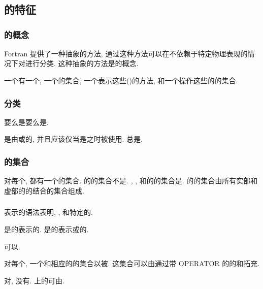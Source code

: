 \chapter{\Type{}}

\section{\Type{}的特征}

\subsection{\Type{}的概念}

Fortran 提供了一种抽象的方法, 通过这种方法可以在不依赖于特定物理表现的情况下对\Data{}进行分类. 这种抽象的方法是\Type{}的概念.

一个\Type{}有一个\Name{}, 一个\Valid{}\Value{}的集合, 一个表示这些\Value{}(\Constant{})的方法, 和一个操作这些\Value{}的\Operation{}的集合.

\subsection{\Type{}分类}

\Type{}要么是\IntrinsicType{}要么是\DerivedType{}.

\DerivedType{}是由\DerivedType{}\Definition{}或\Intrinsic{}\Module{}\Define{}的, 并且应该仅当是\Accessible{}之时被使用. \IntrinsicType{}总是\Accessible{}.

\subsection{\Value{}的集合}

对每个\Type{}, 都有一个\Valid{}\Value{}的集合. \LogicalType{}的\Valid{}\Value{}的集合不是\ProcessorDependent{}. \IntegerType{}, \CharacterType{}, 和\RealType{}的\Valid{}\Value{}的集合是\ProcessorDependent{}. \ComplexType{}的\Valid{}\Value{}的集合由所有实部和虚部的\Value{}的结合的集合组成.

\subsection{\Constant{}}

表示\Value{}的语法表明\Type{}, \TypeParameter{}, 和特定的\Value{}.

是\Constant{}\Expression{}的\StructureConstructor{}表示\DerivedType{}的\Scalar{}\Constant{}\Value{}. 是\Constant{}\Expression{}的\ArrayConstructor{}表示\IntrinsicType{}或\DerivedType{}的\Constant{}\Array{}\Value{}.

\Constant{}\Value{}可以\Named{}.

对每个\IntrinsicType{}, 一个\Operation{}和相应的\Operator{}的集合以被\Intrinsically{}\Define{}. 这\Intrinsic{}集合可以由通过带 OPERATOR \Interface{}的\Function{}\Define{}的\Operation{}和\Operator{}拓充.

对\DerivedType{}, 没有\Intrinsic{}\Operation{}. \DerivedType{}上的\Operation{}可由\Program{}\Define{}.


